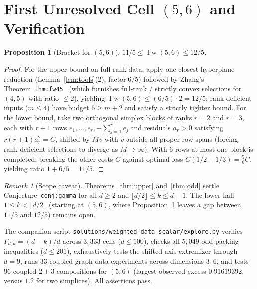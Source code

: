 \documentclass[11pt]{article}
\theoremstyle{plain}
\newtheorem{proposition}[theorem]{Proposition}
\theoremstyle{definition}
\theoremstyle{remark}
\newtheorem{remark}{Remark}
\DeclareMathOperator{\Fw}{Fw}
\begin{document}
\section{First Unresolved Cell \texorpdfstring{$(5, 6)$}{(5, 6)} and Verification}

\begin{proposition}[Bracket for $(5, 6)$]\label{prop:56}
$11/5 \le \Fw(5, 6) \le 12/5$.
\end{proposition}

\begin{proof}
For the upper bound on full-rank data, apply one closest-hyperplane reduction (Lemma~\ref{lem:tools}(2), factor $6/5$) followed by Zhang's Theorem~\texttt{thm:fw45}~\cite[Appendix~F]{Zhang2026} (which furnishes full-rank / strictly convex selections for $(4, 5)$ with ratio $\le 2$), yielding $\Fw(5, 6) \le (6/5) \cdot 2 = 12/5$; rank-deficient inputs ($m \le 4$) have budget $6 \ge m + 2$ and satisfy a strictly tighter bound.
For the lower bound, take two orthogonal simplex blocks of ranks $r = 2$ and $r = 3$, each with $r + 1$ rows $e_1, \dots, e_r, -\sum_{j=1}^r e_j$ and residuals $a_r > 0$ satisfying $r(r + 1)a_r^2 = C$, shifted by $Mv$ with $v$ outside all proper row spans (forcing rank-deficient selections to diverge as $M \to \infty$).
With $6$ rows at most one block is completed; breaking the other costs $C$ against optimal loss $C(1/2 + 1/3) = \frac{5}{6}C$, yielding ratio $1 + 6/5 = 11/5$.
\end{proof}

\begin{remark}[Scope caveat]
Theorems~\ref{thm:upper} and~\ref{thm:odd} settle Conjecture~\texttt{conj:gamma} for all $d \ge 2$ and $\lfloor d/2 \rfloor \le k \le d - 1$.
The lower half $1 \le k < \lfloor d/2 \rfloor$ (starting at $(5, 6)$, where Proposition~\ref{prop:56} leaves a gap between $11/5$ and $12/5$) remains open.
\end{remark}

The companion script \texttt{solutions/weighted\_data\_scalar/explore.py} verifies $\Gamma_{d, k} = (d - k)/d$ across $3{,}333$ cells ($d \le 100$), checks all $5{,}049$ odd-packing inequalities ($d \le 201$), exhaustively tests the shifted-axis extremizer through $d = 9$, runs $33$ coupled graph-data experiments across dimensions $3$--$6$, and tests $96$ coupled $2 + 3$ compositions for $(5, 6)$ (largest observed excess $0.91619392$, versus $1.2$ for two simplices). All assertions pass.
\end{document}

